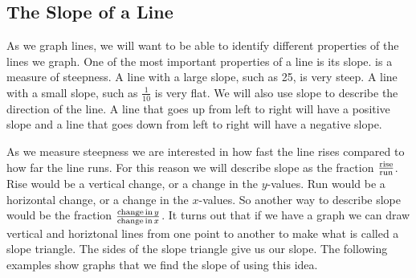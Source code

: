 \subsection{The Slope of a Line}\pp

 {}\pp

 As we graph lines, we will want to be able to identify different properties of
the lines we graph. One of the most important properties of a line is its
slope. {} is a measure of steepness. A line with a large
slope, such as 25, is very steep. A line with a small slope, such as
$\frac{1}{10}$ is very flat. We will also use slope to describe the direction
of the line. A line that goes up from left to right will have a positive slope
and a line that goes down from left to right will have a negative slope.\pp

 As we measure steepness we are interested in how fast the line rises compared
to how far the line runs. For this reason we will describe slope as the
fraction $\frac{\operatorname{rise}}{\operatorname{run}}$. Rise would be a vertical change, or
a change in the $y$-values. Run would be a horizontal change, or a change in
the $x$-values. So another way to describe slope would be the fraction
$\frac{\operatorname{change} \operatorname{in} y}{\operatorname{change} \operatorname{in} x}$. It turns out
that if we have a graph we can draw vertical and horiztonal lines from one
point to another to make what is called a slope triangle. The sides of the
slope triangle give us our slope. The following examples show graphs that we
find the slope of using this idea.


